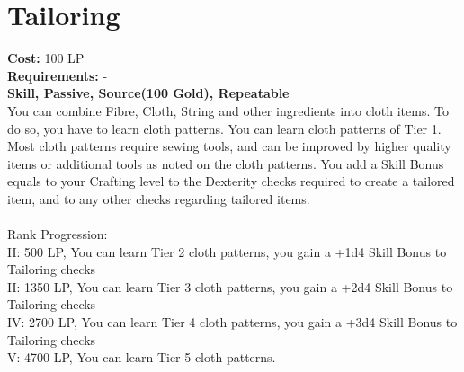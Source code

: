 \section{Tailoring}\label{perk:tailoring}
\textbf{Cost:} 100 LP\\
\textbf{Requirements:} -\\
\textbf{Skill, Passive, Source(100 Gold), Repeatable}\\
You can combine Fibre, Cloth, String and other ingredients into cloth items.
To do so, you have to learn cloth patterns.
You can learn cloth patterns of Tier 1.
Most cloth patterns require sewing tools, and can be improved by higher quality items or additional tools as noted on the cloth patterns.
You add a Skill Bonus equals to your Crafting level to the Dexterity checks required to create a tailored item, and to any other checks regarding tailored items.\\
\\
Rank Progression:\\
II: 500 LP, You can learn Tier 2 cloth patterns, you gain a +1d4 Skill Bonus to Tailoring checks\\
II: 1350 LP, You can learn Tier 3 cloth patterns, you gain a +2d4 Skill Bonus to Tailoring checks\\
IV: 2700 LP, You can learn Tier 4 cloth patterns, you gain a +3d4 Skill Bonus to Tailoring checks\\
V: 4700 LP, You can learn Tier 5 cloth patterns.\\